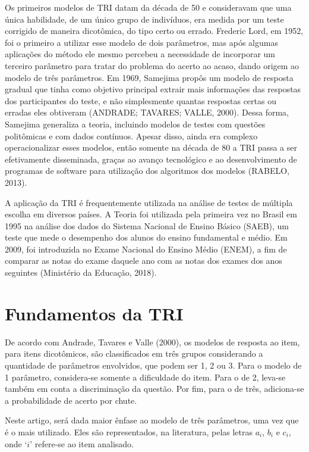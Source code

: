 \documentclass{article}
\begin{document}
Os primeiros modelos de TRI datam da década de 50 e consideravam que uma única habilidade, de um único grupo de indivíduos, era medida por um teste corrigido de maneira dicotômica, do tipo certo ou errado. Frederic Lord, em 1952, foi o primeiro a utilizar esse modelo de dois parâmetros, mas após algumas aplicações do método ele mesmo percebeu a necessidade de incorporar um terceiro parâmetro para tratar do problema do acerto ao acaso, dando origem ao modelo de três parâmetros. Em 1969, Samejima propôs um modelo de resposta gradual que tinha como objetivo principal extrair mais informações das respostas dos participantes do teste, e não simplesmente quantas respostas certas ou erradas eles obtiveram (ANDRADE; TAVARES; VALLE, 2000). Dessa forma, Samejima generaliza a teoria, incluindo modelos de testes com questões politômicas e com dados contínuos. Apesar disso, ainda era complexo operacionalizar esses modelos, então somente na década de 80 a TRI passa a ser efetivamente disseminada, graças ao avanço tecnológico e ao desenvolvimento de programas de software para utilização dos algoritmos dos modelos (RABELO, 2013).
 
 A aplicação da TRI é frequentemente utilizada na análise de testes de múltipla escolha em diversos países. A Teoria foi utilizada pela primeira vez no Brasil em 1995 na análise dos dados do Sistema Nacional de Ensino Básico (SAEB), um teste que mede o desempenho dos alunos do ensino fundamental e médio. Em 2009, foi introduzida no Exame Nacional do Ensino Médio (ENEM), a fim de comparar as notas do exame daquele ano com as notas dos exames dos anos seguintes (Ministério da Educação, 2018).

\section{Fundamentos da TRI}

De acordo com Andrade, Tavares e Valle (2000), os modelos de resposta ao item, para itens dicotômicos, são classificados em três grupos considerando a quantidade de parâmetros envolvidos, que podem ser 1, 2 ou 3. Para o modelo de 1 parâmetro, considera-se somente a dificuldade do item. Para o de 2, leva-se também em conta a discriminação da questão. Por fim, para o de três, adiciona-se a probabilidade de acerto por chute.

Neste artigo, será dada maior ênfase ao modelo de três parâmetros, uma vez que é o mais utilizado. Eles são representados, na literatura, pelas letras $a_i$, $b_i$ e $c_i$, onde ‘$i$’ refere-se ao item analisado.
\end{document}
